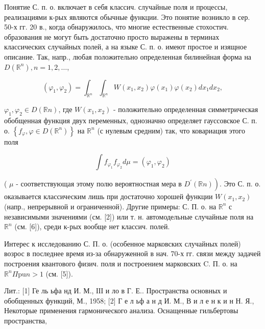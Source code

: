 \documentclass[10pt]{article}
\begin{document}
Понятие С. п. о. включает в себя классич. случайные поля и процессы, реализациями к-рых являются обычные функции. Это понятие возникло в сер. 50-х гг. 20 в., когда обнаружилось, что многие естественные стохостич. образования не могут быть достаточно просто выражены в терминах классических случайных полей, а на языке С. п. о. имеют простое и изящное описание. Так, напр., любая положительно определенная билинейная форма на $D\left(\mathbb{R}^{n}\right), n=1,2, \ldots$,



\[

\left(\varphi_{1}, \varphi_{2}\right)=\int_{\mathbb{R}^{n}} \int_{\mathbb{R}^{n}} W\left(x_{1}, x_{2}\right) \varphi\left(x_{1}\right) \varphi\left(x_{2}\right) d x_{1} d x_{2},

\]



$\varphi_{1}, \varphi_{2} \in D(\mathbb{R} n)$, где $W\left(x_{1}, x_{2}\right)$ - положительно определенная симметрическая обобщенная функция двух переменных, однозначно определяет гауссовское С. п. о. $\left\{f_{\varphi}, \varphi \in D\left(\mathbb{R}^{n}\right)\right\}$ на $\mathbb{R}^{n}$ (с нулевым средним) так, что ковариация этого поля



\[

\int f_{\varphi_{1}} f_{\varphi_{2}} d \mu=\left(\varphi_{1}, \varphi_{2}\right)

\]



( $\mu$ - соответствующая этому полю вероятностная мера в $\left.D^{\prime}(\mathbb{R} n)\right)$. Это С. п. о. оказывается классическим лишь при достаточно хорошей функции $W\left(x_{1}, x_{2}\right)$ (напр., непрерывной и ограниченной). Другие примеры: С. П. о. на $\mathbb{R}^{n}$ с независимыми значениями (см. [2]) или т. н. автомодельные случайные поля на $\mathbb{R}^{n}$ (см. [6]), среди к-рых вообще нет классич. полей.



Интерес к исследованию С. П. о. (особенное марковских случайных полей) возрос в последнее время из-за обнаруженной в нач. 70-х гг. связи между задачей построения квантового физич. поля и построением марковских C. П. о. на $\mathbb{R}^{n} \Pi \mathrm{pu} n>1$ (см. [5]).



Лит.: [1] Ге ль ьфа нд И. М., ІІІ и ло в Г. Е.. Пространства основных и обобщенных функций, М., 1958; [2] Г е л ьф а н д И. М., В и л е н к и н Н. Я., Некоторые применения гармонического анализа. Оснащенные гильбертовы пространства,
\end{document}
